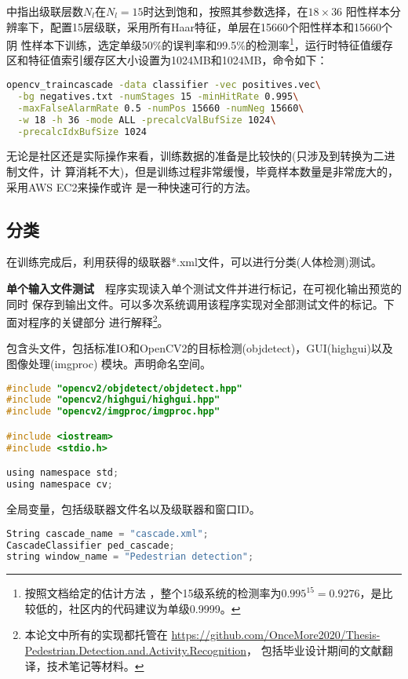 \cite{survey}中指出级联层数$N_l$在$N_l=15$时达到饱和，按照其参数选择，在$18\times36$
阳性样本分辨率下，配置15层级联，采用所有Haar特征，单层在15660个阳性样本和15660个阴
性样本下训练，选定单级50\%的误判率和99.5\%的检测率\footnote{按照文档给定的估计方法
，整个15级系统的检测率为$0.995^{15}=0.9276$，是比较低的，社区内的代码建议为单级0.9999。
}，运行时特征值缓存区和特征值索引缓存区大小设置为1024MB和1024MB，命令如下：
\begin{lstlisting}[language=bash]
opencv_traincascade -data classifier -vec positives.vec\
  -bg negatives.txt -numStages 15 -minHitRate 0.995\
  -maxFalseAlarmRate 0.5 -numPos 15660 -numNeg 15660\
  -w 18 -h 36 -mode ALL -precalcValBufSize 1024\
  -precalcIdxBufSize 1024
\end{lstlisting}
无论是社区还是实际操作来看，训练数据的准备是比较快的(只涉及到转换为二进制文件，计
算消耗不大)，但是训练过程非常缓慢，毕竟样本数量是非常庞大的，采用AWS EC2来操作或许
是一种快速可行的方法。

\subsection{分类}
在训练完成后，利用获得的级联器\textsf{*.xml}文件，可以进行分类(人体检测)测试。

\textbf{单个输入文件测试}~~程序实现读入单个测试文件并进行标记，在可视化输出预览的同时
保存到输出文件。可以多次系统调用该程序实现对全部测试文件的标记。下面对程序的关键部分
进行解释\footnote{本论文中所有的实现都托管在
\url{https://github.com/OnceMore2020/Thesis-Pedestrian.Detection.and.Activity.Recognition}，
包括毕业设计期间的文献翻译，技术笔记等材料。}。

包含头文件，包括标准IO和OpenCV2的目标检测(objdetect)，GUI(highgui)以及图像处理(imgproc)
模块。声明命名空间。

\begin{lstlisting}[language=C]
#include "opencv2/objdetect/objdetect.hpp"
#include "opencv2/highgui/highgui.hpp"
#include "opencv2/imgproc/imgproc.hpp"

#include <iostream>
#include <stdio.h>

using namespace std;
using namespace cv;
\end{lstlisting}

全局变量，包括级联器文件名以及级联器和窗口ID。

\begin{lstlisting}[language=C]
String cascade_name = "cascade.xml";
CascadeClassifier ped_cascade;
string window_name = "Pedestrian detection";
\end{lstlisting}


